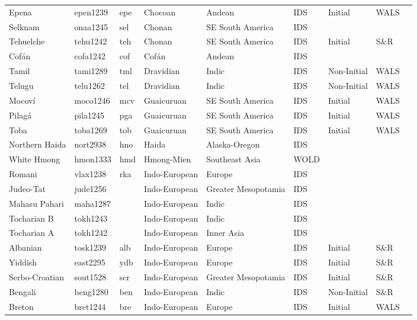 \begin{longtable}{lllllllll}
  Epena & epen1239 & epe & Chocoan & Andean & IDS & Initial & WALS &  \\ 
  Selknam & onaa1245 & sel & Chonan & SE South America & IDS &  &  &  \\ 
  Tehuelche & tehu1242 & teh & Chonan & SE South America & IDS & Initial & S\&R & \cite[425]{garay_tehuelche1998.pdf} \\ 
  Cofán & cofa1242 & cof & Cofán & Andean & IDS &  &  &  \\ 
  Tamil & tami1289 & tml & Dravidian & Indic & IDS & Non-Initial & WALS &  \\ 
  Telugu & telu1262 & tel & Dravidian & Indic & IDS & Non-Initial & WALS &  \\ 
  Mocoví & moco1246 & mcv & Guaicuruan & SE South America & IDS & Initial & WALS &  \\ 
  Pilagá & pila1245 & pga & Guaicuruan & SE South America & IDS & Initial & WALS &  \\ 
  Toba & toba1269 & tob & Guaicuruan & SE South America & IDS & Initial & WALS &  \\ 
  Northern Haida & nort2938 & hno & Haida & Alaska-Oregon & IDS &  &  &  \\ 
  White Hmong & hmon1333 & hmd & Hmong-Mien & Southeast Asia & WOLD &  &  &  \\ 
  Romani & vlax1238 & rka & Indo-European & Europe & IDS &  &  &  \\ 
  Judeo-Tat & jude1256 &  & Indo-European & Greater Mesopotamia & IDS &  &  &  \\ 
  Mahasu Pahari  & maha1287 &  & Indo-European & Indic & IDS &  &  &  \\ 
  Tocharian B & tokh1243 &  & Indo-European & Indic & IDS &  &  &  \\ 
  Tocharian A & tokh1242 &  & Indo-European & Inner Asia & IDS &  &  &  \\ 
  Albanian  & tosk1239 & alb & Indo-European & Europe & IDS & Initial & S\&R &  \\ 
  Yiddish & east2295 & ydb & Indo-European & Europe & IDS & Initial & S\&R & \cite[38]{zucker_yiddish1994.pdf} \\ 
  Serbo-Croatian & sout1528 & scr & Indo-European & Greater Mesopotamia & IDS & Initial & S\&R &  \\ 
  Bengali & beng1280 & ben & Indo-European & Indic & IDS & Non-Initial & S\&R & \cite[63...]{hudson_bengali1965.pdf} \\ 
  Breton & bret1244 & bre & Indo-European & Europe & IDS & Initial & WALS &  \\ 

\end{longtable}
